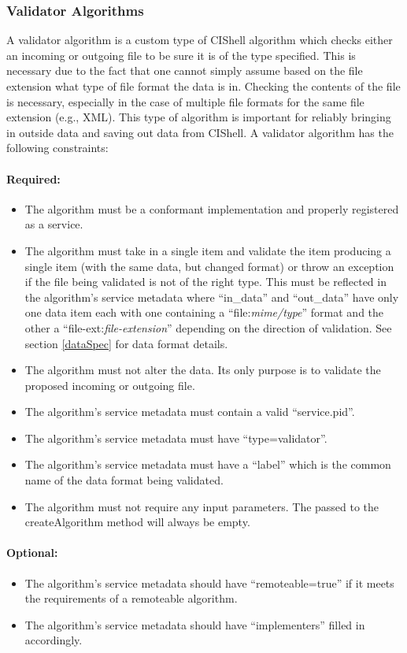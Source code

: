 \subsubsection{Validator Algorithms}

A validator algorithm is a custom type of CIShell algorithm which checks either
an incoming or outgoing file to be sure it is of the type specified. This is
necessary due to the fact that one cannot simply assume based on the file
extension what type of file format the data is in. Checking the contents of the
file is necessary, especially in the case of multiple file formats for the same
file extension (e.g., XML). This type of algorithm is important for reliably
bringing in outside data and saving out data from CIShell. A validator algorithm
has the following constraints:

\paragraph*{Required:}
\begin{itemize}
  \item The algorithm must be a conformant 
  implementation and properly registered as a service.
  \item The algorithm must take in a single  item and validate the
  item producing a single  item (with the same data, but changed
  format) or throw an exception if the file being validated is not of the right
  type. This must be reflected in the algorithm's service metadata where
  ``in\_data'' and ``out\_data'' have only one data item each with one
  containing a ``file:\textit{mime/type}'' format and the other a
  ``file-ext:\textit{file-extension}'' depending on the direction of validation.
  See section \ref{dataSpec} for data format details.
  \item The algorithm must not alter the data. Its only purpose is to validate
  the proposed incoming or outgoing file.
  \item The algorithm's service metadata must contain a valid ``service.pid''.
  \item The algorithm's service metadata must have ``type=validator''.
  \item The algorithm's service metadata must have a ``label'' which is the
  common name of the data format being validated.
  \item The algorithm must not require any input parameters. The
   passed to the createAlgorithm method will always be empty.
\end{itemize}

\paragraph*{Optional:}
\begin{itemize}
  \item The algorithm's service metadata should have ``remoteable=true'' if it
  meets the requirements of a remoteable algorithm.
  \item The algorithm's service metadata should have ``implementers'' filled
  in accordingly.
\end{itemize}
